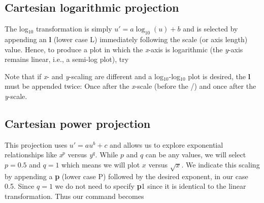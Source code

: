 
\subsection{Cartesian logarithmic projection}


The log$_{10}$ transformation is simply $u' = a \log_{10}(u) + b$ and is selected by appending an \textbf{l}
(lower case L) immediately following the scale (or axis length)
value.  Hence, to produce a plot in which the \emph{x}-axis is
logarithmic (the \emph{y}-axis remains linear, i.e., a semi-log plot), try 


\par Note that if \emph{x}- and \emph{y}-scaling are different and
a log$_{10}$-log$_{10}$ plot is desired, the \textbf{l} must be
appended twice: Once after the \emph{x}-scale (before the /) and
once after the \emph{y}-scale. 


\subsection{Cartesian power projection}


This projection uses $u' = a u^b + c$ and allows us to explore exponential relationships like \emph{x$^p$} versus \emph{y$^q$}.
While $p$ and $q$ can be any values, we will select $p
= 0.5$ and $q = 1$ which means we will plot $x$ versus $\sqrt{x}$.
We indicate this scaling by appending a \textbf{p} (lower case P) followed
by the desired exponent, in our case 0.5.  Since $q = 1$ we do not
need to specify \textbf{p}1 since it is identical to the linear transformation.
Thus our command becomes

